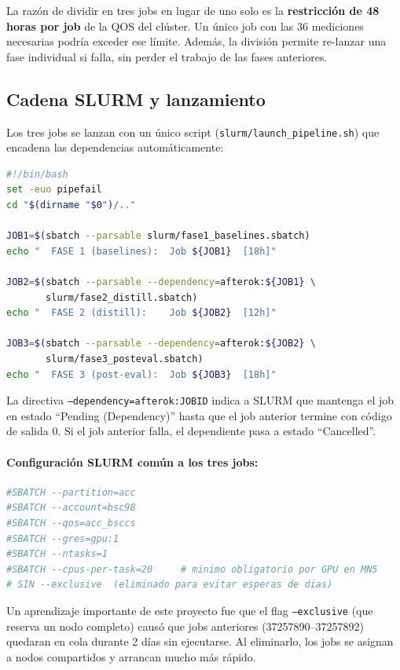 \documentclass[11pt,a4paper]{article}
\begin{document}
La raz\'on de dividir en tres jobs en lugar de uno solo es la
\textbf{restricci\'on de 48 horas por job} de la QOS del cl\'uster. Un
\'unico job con las 36 mediciones necesarias podr\'ia exceder ese
l\'imite. Adem\'as, la divisi\'on permite re-lanzar una fase individual
si falla, sin perder el trabajo de las fases anteriores.

\subsection{Cadena SLURM y lanzamiento}

Los tres jobs se lanzan con un \'unico script
(\texttt{slurm/launch\_pipeline.sh}) que encadena las dependencias
autom\'aticamente:

\begin{lstlisting}[language=bash,
  caption={Script \texttt{slurm/launch\_pipeline.sh}.}]
#!/bin/bash
set -euo pipefail
cd "$(dirname "$0")/.."

JOB1=$(sbatch --parsable slurm/fase1_baselines.sbatch)
echo "  FASE 1 (baselines):  Job ${JOB1}  [18h]"

JOB2=$(sbatch --parsable --dependency=afterok:${JOB1} \
       slurm/fase2_distill.sbatch)
echo "  FASE 2 (distill):    Job ${JOB2}  [12h]"

JOB3=$(sbatch --parsable --dependency=afterok:${JOB2} \
       slurm/fase3_posteval.sbatch)
echo "  FASE 3 (post-eval):  Job ${JOB3}  [18h]"
\end{lstlisting}

La directiva \texttt{--dependency=afterok:JOBID} indica a SLURM que
mantenga el job en estado ``Pending (Dependency)'' hasta que el job
anterior termine con c\'odigo de salida 0. Si el job anterior falla, el
dependiente pasa a estado ``Cancelled''.

\paragraph{Configuraci\'on SLURM com\'un a los tres jobs:}
\begin{lstlisting}[language=bash,
  caption={Directivas SLURM comunes.}]
#SBATCH --partition=acc
#SBATCH --account=bsc98
#SBATCH --qos=acc_bsccs
#SBATCH --gres=gpu:1
#SBATCH --ntasks=1
#SBATCH --cpus-per-task=20     # minimo obligatorio por GPU en MN5
# SIN --exclusive  (eliminado para evitar esperas de dias)
\end{lstlisting}

Un aprendizaje importante de este proyecto fue que el flag
\texttt{--exclusive} (que reserva un nodo completo) caus\'o que jobs
anteriores (37257890--37257892) quedaran en cola durante 2 d\'ias sin
ejecutarse. Al eliminarlo, los jobs se asignan a nodos compartidos y
arrancan mucho m\'as r\'apido.
\end{document}
